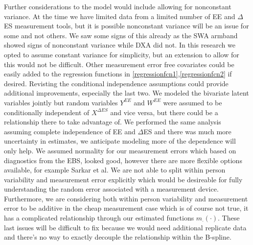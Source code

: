 \documentclass[11pt]{article}\usepackage[]{graphicx}\usepackage[]{color}
\begin{document}
Further considerations to the model would include allowing for nonconstant variance. At the time we have limited data from a limited number of EE and $\Delta$ES measurement tools, but it is possible nonconstant variance will be an issue for some and not others. We saw some signs of this already as the SWA armband showed signs of nonconstant variance while DXA did not. In this research we opted to assume constant variance for simplicity, but an extension to allow for this would not be difficult. Other measurement error free covariates could be easily added to the regression functions in \eqref{regressionfcn1},\eqref{regressionfcn2} if desired. Revisting the conditional independence assumptions could provide additional improvements, especially the last two. We modeled the bivariate latent variables jointly but random variables $Y^{EE}$ and $W^{EE}$ were assumed to be conditionally independent of $X^{\Delta ES}$ and vice versa, but there could be a relationship there to take advantage of. We performed the same analysis assuming complete independence of EE and $\Delta$ES and there was much more uncertainty in estimates, we anticipate modeling more of the dependence will only help. We assumed normality for our measurement errors which based on diagnostics from the EBS, looked good, however there are more flexible options available, for example Sarkar et al. We are not able to split within person variability and measurement error explicitly which would be desireable for fully understanding the random error associated with a measurement device. Furthermore, we are considering both within person variability and measurement error to be additive in the cheap measurement case which is of course not true, it has a complicated relationship through our estimated functions $m_{\cdot}(\cdot)$. These last issues will be difficult to fix because we would need additional replicate data and there's no way to exactly decouple the relationship within the B-spline.


\clearpage
\end{document}
